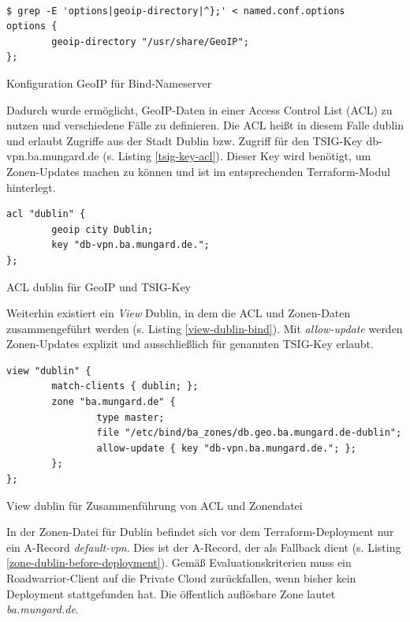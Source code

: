 \begin{listing}[h]
\begin{verbatim}

$ grep -E 'options|geoip-directory|^};' < named.conf.options
options {
        geoip-directory "/usr/share/GeoIP";
};

\end{verbatim}
\caption{Konfiguration GeoIP für Bind-Nameserver}
\label{bind-geoip-directory}
\end{listing}\FloatBarrier
Dadurch wurde ermöglicht, \gls{GeoIP}-Daten in einer Access Control List (\gls{ACL}) zu nutzen und verschiedene Fälle zu definieren. Die \gls{ACL} heißt in diesem Falle \glqq dublin\grqq{} und erlaubt Zugriffe aus der Stadt Dublin bzw. Zugriff für den \gls{TSIG}-Key \glqq db-vpn.ba.mungard.de\grqq{} (s. Listing \ref{tsig-key-acl}). Dieser Key wird benötigt, um Zonen-Updates machen zu können und ist im entsprechenden Terraform-Modul hinterlegt.
\begin{listing}[h]
\begin{verbatim}
acl "dublin" {
        geoip city Dublin;
        key "db-vpn.ba.mungard.de.";
};
\end{verbatim}
\caption{ACL \glqq dublin\grqq{} für GeoIP und TSIG-Key}
\label{tsig-key-acl}
\end{listing}\FloatBarrier
Weiterhin existiert ein \textit{\gls{View}} \glqq Dublin\grqq{}, in dem die \gls{ACL} und Zonen-Daten zusammengeführt werden (s. Listing \ref{view-dublin-bind}). Mit \textit{allow-update} werden Zonen-Updates explizit und ausschließlich für genannten \gls{TSIG}-Key erlaubt.
\begin{listing}[h]
\begin{verbatim}
view "dublin" {
        match-clients { dublin; };
        zone "ba.mungard.de" {
                type master;
                file "/etc/bind/ba_zones/db.geo.ba.mungard.de-dublin";
                allow-update { key "db-vpn.ba.mungard.de."; };
        };
};
\end{verbatim}
\caption{View \glqq dublin\grqq{} für Zusammenführung von ACL und Zonendatei}
\label{view-dublin-bind}
\end{listing}\FloatBarrier
In der Zonen-Datei für Dublin befindet sich vor dem Terraform-\gls{Deployment} nur ein A-Record \textit{default-vpn}. Dies ist der A-Record, der als \gls{Fallback} dient (s. Listing \ref{zone-dublin-before-deployment}). Gemäß Evaluationskriterien muss ein \gls{Roadwarrior}-\gls{Client} auf die Private Cloud zurückfallen, wenn bisher kein \gls{Deployment} stattgefunden hat. Die öffentlich auflösbare Zone lautet \textit{ba.mungard.de}.
